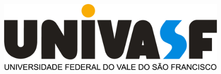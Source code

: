 \begin{capa}
    \setlength{\belowcaptionskip}{0pt}
    \setlength{\abovecaptionskip}{0pt}
    \setlength{\intextsep}{-18pt}
        \begin{figure}[h]
    		\begin{center}
    		    \includegraphics[scale=.5]{img/NEW_LOGO_UNIVASF.jpg}
    		\end{center}
    	\end{figure}

        \center
    	{\ABNTEXchapterfont\large\imprimirinstituicao}

    	\vspace*{2cm}
    	    {\imprimirautor}
    	\vspace*{2cm}
        \begin{center}
    		\ABNTEXchapterfont\bfseries\large\imprimirtitulo
        \end{center}
    	\vfill

    	\ABNTEXchapterfont\bfseries\large\imprimirlocal\\
    	\the\year

    	\vspace*{1cm}
\end{capa}
